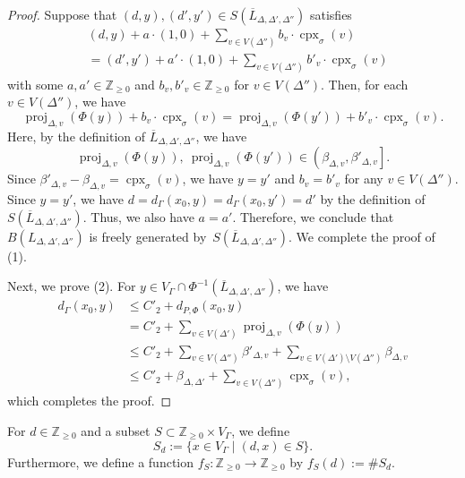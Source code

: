 \documentclass[11pt]{article}
\theoremstyle{definition}
\numberwithin{equation}{section}
\begin{document}
\begin{proof}
Suppose that $(d, y), (d', y') \in S \left(\overline{L}_{\Delta, \Delta ', \Delta''} \right)$ satisfies 
\begin{align*}
&(d,y) + a \cdot (1,0) + \sum _{v \in V(\Delta '')} b_v \cdot \operatorname{cpx}_{\sigma}(v)\\
&= 
(d',y') + a' \cdot (1,0) + \sum _{v \in V(\Delta '')} b'_v \cdot \operatorname{cpx}_{\sigma}(v)
\end{align*}
with some $a, a' \in \mathbb{Z}_{\ge 0}$ and $b_v, b'_v \in \mathbb{Z}_{\ge 0}$ for $v \in V(\Delta '')$. 
Then, for each $v \in V(\Delta '')$, we have 
\[
\operatorname{proj}_{\Delta, v} (\Phi (y) ) + b_v \cdot \operatorname{cpx}_{\sigma}(v) = 
\operatorname{proj}_{\Delta, v} (\Phi(y')) + b'_v \cdot \operatorname{cpx}_{\sigma}(v). 
\]
Here, by the definition of $\overline{L}_{\Delta, \Delta ', \Delta''}$, 
we have 
\[
\operatorname{proj}_{\Delta, v} (\Phi (y) ), \ \operatorname{proj}_{\Delta, v} (\Phi(y')) \in \left( \beta_{\Delta, v}, \beta' _{\Delta, v} \right]. 
\]
Since $\beta' _{\Delta, v} - \beta _{\Delta, v} = \operatorname{cpx}_{\sigma}(v) $, we have $y=y'$ and $b_v = b'_v$ for any $v \in V(\Delta '')$. 
Since $y = y'$, we have $d = d_{\Gamma} (x_0, y) = d_{\Gamma} (x_0, y')  = d'$ by the definition of $S \left(\overline{L}_{\Delta, \Delta ', \Delta''}  \right)$. 
Thus, we also have $a = a'$. 
Therefore, we conclude that $B \left( L_{\Delta, \Delta ', \Delta''} \right)$ is freely generated by~$S \left(\overline{L}_{\Delta, \Delta ', \Delta''}  \right)$. We complete the proof of (1). 

Next, we prove (2). 
For $y \in V_{\Gamma} \cap \Phi ^{-1}\left( \overline{L}_{\Delta, \Delta ', \Delta''} \right)$, we have 
\begin{align*}
d_{\Gamma}(x_0, y)
&\le C' _2 + d_{P, \Phi}(x_0, y) \\
&= C' _2 + \sum _{v \in V(\Delta ')} \operatorname{proj}_{\Delta, v}(\Phi(y)) \\
&\le C'_2 + \sum _{v \in V(\Delta '')} \beta' _{\Delta, v} + \sum _{v \in V(\Delta ') \setminus V(\Delta '')} \beta _{\Delta, v}\\
&\le C'_2 + \beta _{\Delta, \Delta '} + \sum _{v \in V(\Delta '')} \operatorname{cpx}_{\sigma}(v), 
\end{align*}
which completes the proof. 
\end{proof}





\begin{defn}
For $d \in \mathbb{Z}_{\ge 0}$ and a subset $S \subset \mathbb{Z}_{\ge 0} \times V_{\Gamma}$, we define 
\[
S_d := \{ x \in V_{\Gamma} \mid (d,x) \in S \}. 
\]
Furthermore, we define a function $f_{S} : \mathbb{Z}_{\ge 0} \to \mathbb{Z}_{\ge 0}$ by $f_{S} (d) := \# S_d$. 
\end{defn}
\end{document}
